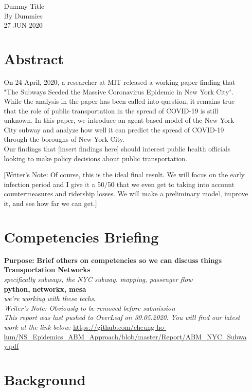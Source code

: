 \documentclass[12pt, a4, epsf] {article}
\theoremstyle{plain}
\theoremstyle{definition}
\begin{document}
\begin{center}

{\Large Dummy Title\\}
By Dummies \\
27 JUN 2020
\end{center}

\section*{Abstract}
On 24 April, 2020, a researcher at MIT released a working paper finding that "The Subways Seeded the Massive Coronavirus Epidemic in New York City". While the analysis in the paper has been called into question, it remains true that the role of public transportation in the spread of COVID-19 is still unknown. In this paper, we introduce an agent-based model of the New York City subway and analyze how well it can predict the spread of COVID-19 through the boroughs of New York City.\\

Our findings that [insert findings here] should interest public health officials looking to make policy decisions about public transportation.

[Writer's Note: Of course, this is the ideal final result. We will focus on the early infection period and I give it a 50/50 that we even get to taking into account countermeasures and ridership losses. We will make a preliminary model, improve it, and see how far we can get.]

\section*{Competencies Briefing}
\textbf{Purpose: Brief others on competencies so we can discuss things\\}
\textbf{Transportation Networks\\}
\textit{specifically subways, the NYC subway. mapping, passenger flow\\}
\textbf{python, networkx, mesa\\}
\textit{we're working with these techs.\\}
\textit{Writer's Note: Obviously to be removed before submission\\}
\textit{This report was last pushed to OverLeaf on 30.05.2020. You will find our latest work at the link below:}
\url{https://github.com/cheung-ho-lum/NS_Epidemics_ABM_Approach/blob/master/Report/ABM_NYC_Subway.pdf}

\section*{Background}
\end{document}
